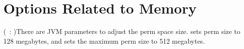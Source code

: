 \chapter{\jre Options Related to Memory}
\label{chapter:jre-options}

(\oracle~: )There are JVM parameters to adjust
the perm space size.  sets perm size to 128 megabytes,
and  sets the maximum perm size to 512 megabytes.
